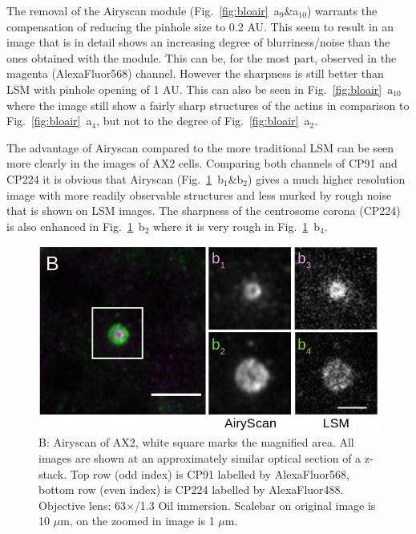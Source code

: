 The removal of the Airyscan module (Fig.~\ref{fig:bloair}~a$_{9}$\&a$_{10}$) warrants the compensation of reducing the pinhole size to 0.2 AU. 
This seem to result in an image that is in detail shows an increasing degree of blurriness/noise than the ones obtained with the module. 
This can be, for the most part, observed in the magenta (AlexaFluor568) channel. 
However the sharpness is still better than LSM with pinhole opening of 1 AU. 
This can also be seen in Fig.~\ref{fig:bloair}~a$_{10}$ where the image still show a fairly sharp structures of the actins in comparison to Fig.~\ref{fig:bloair}~a$_{4}$, but not to the degree of Fig.~\ref{fig:bloair}~a$_{2}$.  

The advantage of Airyscan compared to the more traditional LSM can be seen more clearly in the images of AX2 cells. 
Comparing both channels of CP91 and CP224 it is obvious that Airyscan (Fig.~\ref{fig:dicair}~b$_{1}$\&b$_{2}$) gives a much higher resolution image with more readily observable structures and less murked by rough noise that is shown on LSM images. 
The sharpness of the centrosome corona (CP224) is also enhanced in Fig.~\ref{fig:dicair}~b$_{2}$ where it is very rough in Fig.~\ref{fig:dicair}~b$_{4}$.

\begin{figure}[h!]
\centering
\includegraphics[width=.9\columnwidth]{Exp_6_Airyscan/Figures/DictSl}
\caption{B: Airyscan of AX2, white square marks the magnified area. 
All images are shown at an approximately similar optical section of a z-stack. 
Top row (odd index) is CP91 labelled by AlexaFluor568, bottom row (even index) is CP224 labelled by AlexaFluor488. 
Objective lens: 63$\times$/1.3 Oil immersion. 
Scalebar on original image is 10 $\mu$m, on the zoomed in image is 1 $\mu$m.} 
\label{fig:dicair}
\end{figure}



\renewcommand{\refname}{\spacedlowsmallcaps{References}} %

%

